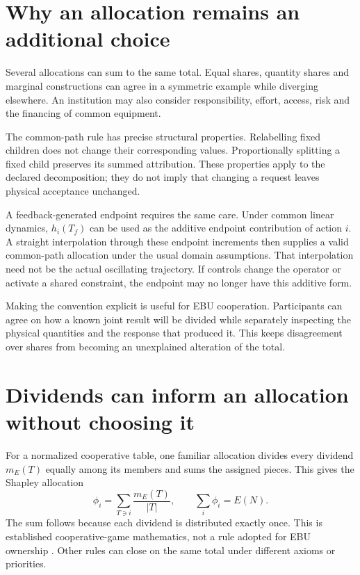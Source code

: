 \section{Why an allocation remains an additional choice}
Several allocations can sum to the same total. Equal shares, quantity shares and marginal constructions can agree in a symmetric example while diverging elsewhere. An institution may also consider responsibility, effort, access, risk and the financing of common equipment.

The common-path rule has precise structural properties. Relabelling fixed children does not change their corresponding values. Proportionally splitting a fixed child preserves its summed attribution. These properties apply to the declared decomposition; they do not imply that changing a request leaves physical acceptance unchanged.

A feedback-generated endpoint requires the same care. Under common linear dynamics, $h_i(T_f)$ can be used as the additive endpoint contribution of action $i$. A straight interpolation through these endpoint increments then supplies a valid common-path allocation under the usual domain assumptions. That interpolation need not be the actual oscillating trajectory. If controls change the operator or activate a shared constraint, the endpoint may no longer have this additive form.

Making the convention explicit is useful for EBU cooperation. Participants can agree on how a known joint result will be divided while separately inspecting the physical quantities and the response that produced it. This keeps disagreement over shares from becoming an unexplained alteration of the total.

\section{Dividends can inform an allocation without choosing it}
For a normalized cooperative table, one familiar allocation divides every dividend $m_E(T)$ equally among its members and sums the assigned pieces. This gives the Shapley allocation
\begin{equation}
 \phi_i=\sum_{T\ni i}\frac{m_E(T)}{|T|},
 \qquad \sum_i\phi_i=E(N).
\end{equation}
The sum follows because each dividend is distributed exactly once. This is established cooperative-game mathematics, not a rule adopted for EBU ownership \cite{harsanyi,grabisch}. Other rules can close on the same total under different axioms or priorities.

